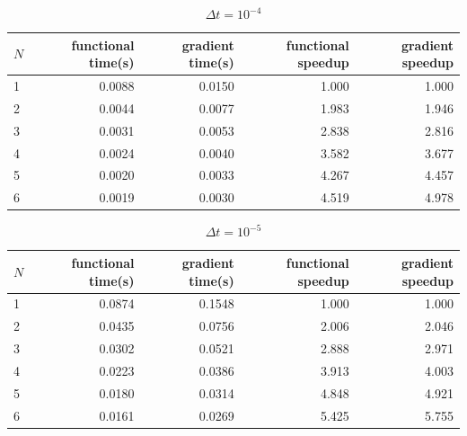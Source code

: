 \begin{table}[!h]
\centering
\caption{$\Delta t=10^{-4}$}
\begin{tabular}{lrrrr}
\toprule
{} $N$&  functional time(s) &  gradient time(s) &  functional speedup &  gradient speedup \\
\midrule
1 &           0.0088 &          0.0150 &            1.000 &          1.000 \\
2 &           0.0044 &          0.0077 &            1.983 &          1.946 \\
3 &           0.0031 &          0.0053 &            2.838 &          2.816 \\
4 &           0.0024 &          0.0040 &            3.582 &          3.677 \\
5 &           0.0020 &          0.0033 &            4.267 &          4.457 \\
6 &           0.0019 &          0.0030 &            4.519 &          4.978 \\
\bottomrule
\end{tabular}
\end{table}
\begin{table}[!h]
\centering
\caption{$\Delta t=10^{-5}$}
\begin{tabular}{lrrrr}
\toprule
{} $N$&  functional time(s) &  gradient time(s) &  functional speedup &  gradient speedup \\
\midrule
1 &           0.0874 &          0.1548 &            1.000 &          1.000 \\
2 &           0.0435 &          0.0756 &            2.006 &          2.046 \\
3 &           0.0302 &          0.0521 &            2.888 &          2.971 \\
4 &           0.0223 &          0.0386 &            3.913 &          4.003 \\
5 &           0.0180 &          0.0314 &            4.848 &          4.921 \\
6 &           0.0161 &          0.0269 &            5.425 &          5.755 \\
\bottomrule
\end{tabular}
\end{table}
